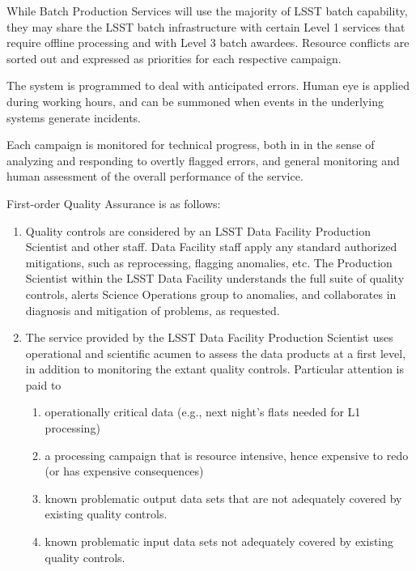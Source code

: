 While Batch Production Services will use the majority of LSST batch capability, 
they may share the LSST batch infrastructure with certain Level 1 services that 
require offline processing and with Level 3 batch awardees. Resource conflicts 
are sorted out and expressed as priorities for each respective campaign.

The system is programmed to deal with anticipated errors. Human eye is applied 
during working hours, and can be summoned when events in the underlying systems 
 generate incidents.

Each campaign is monitored for technical progress, both in in the sense of 
analyzing and responding to overtly flagged errors, and general monitoring and 
human assessment of the overall performance of the service.

First-order Quality Assurance is as follows:

\begin{enumerate}

\item Quality controls are considered by an LSST Data Facility Production 
Scientist and other staff. Data Facility staff apply any standard authorized 
mitigations, such as reprocessing, flagging anomalies, etc. The Production
Scientist within the LSST Data Facility understands the full suite of quality 
controls, alerts Science Operations group to anomalies, and collaborates in 
diagnosis and mitigation of problems, as requested.

\item The service provided by the LSST Data Facility Production Scientist uses 
operational and scientific acumen to assess the data products at a first level, 
in addition to monitoring the extant quality controls. Particular attention is 
paid to

    \begin{enumerate}

    \item operationally critical data (e.g., next night’s flats needed for L1 
    processing)

    \item a processing campaign that is resource intensive, hence expensive to 
    redo (or has expensive consequences)

    \item known problematic output data sets that are not adequately covered by 
    existing quality controls.

    \item known problematic input data sets not adequately covered by existing 
    quality controls.

    \end{enumerate}

\end{enumerate}

